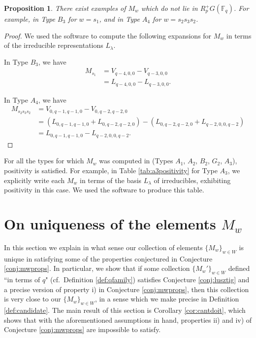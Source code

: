 \documentclass{amsart}
\newtheorem{prop}[thm]{Proposition}
\theoremstyle{definition}
\begin{document}
\begin{prop}\label{prop:nopositivity}
    There exist examples of $M_w$ which do not lie in $R_{p}^+G(\mathbb{F}_q)$. For example, in Type $B_3$ for $w = s_1$, and in Type $A_4$ for $w = s_2s_3s_2$.
\end{prop}
\begin{proof}
    We used the software \cite{dynkin} to compute the following expansions for $M_w$ in terms of the irreducible representations $L_{\lambda}$.

    In Type $B_3$, we have
    \begin{align*}
        M_{s_1} & = V_{q-4,0,0} - V_{q-3,0,0}\\
        & = L_{q-4,0,0} - L_{q-3,0,0}.
    \end{align*}

    In Type $A_4$, we have
    \begin{align*}
    M_{s_2s_3s_2} & = V_{0,q-1,q-1,0} - V_{0,q-2,q-2,0}\\
    & = (L_{0,q-1,q-1,0} + L_{0,q-2,q-2,0}) - (L_{0,q-2,q-2,0} + L_{q-2,0,0,q-2})\\
    & = L_{0,q-1,q-1,0} - L_{q-2,0,0,q-2}.
    \end{align*}
\end{proof}

For all the types for which $M_w$ was computed in \cite{L} (Types $A_1$, $A_2$, $B_2$, $G_2$, $A_3$), positivity is satisfied. For example, in Table \ref{tab:a3positivity} for Type $A_3$, we explicitly write each $M_w$ in terms of the basis $L_{\lambda}$ of irreducibles, exhibiting positivity in this case. We used the software \cite{dynkin} to produce this table.

\section{On uniqueness of the elements $M_w$}\label{sec:uniqueness}

In this section we explain in what sense our collection of elements $\{M_w\}_{w \in W}$ is unique in satisfying some of the properties conjectured in Conjecture \ref{conj:mwprops}. In particular, we show that if some collection $\{M_w'\}_{w \in W}$ defined ``in terms of $q$" (cf.\ Definition \ref{def:qfamily}) satisfies Conjecture \ref{conj:lusztig} and a precise version of property i) in Conjecture \ref{conj:mwprops}, then this collection is very close to our $\{M_w\}_{w \in W}$, in a sense which we make precise in Definition \ref{def:candidate}. The main result of this section is Corollary \ref{cor:cantdoit}, which shows that with the aforementioned assumptions in hand, properties ii) and iv) of Conjecture \ref{conj:mwprops} are impossible to satisfy.
\end{document}
